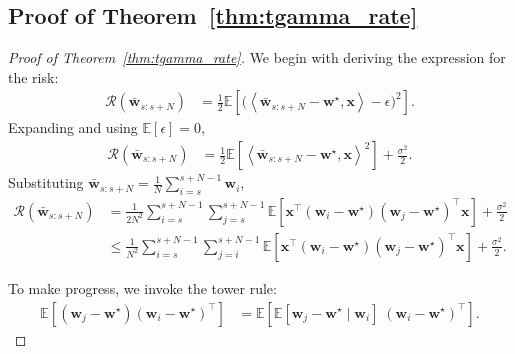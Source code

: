 \documentclass{article}
\def\bw{\bar{\mathbf{w}}}
\def\la{\langle

}
\def\ra{\rangle}
\def\x{{\mathbf{x}}}
\def\w{{\mathbf{w}}}
\def\risk{\mathcal{R}}
\def\ra{{\textnormal{a}}}
\newcommand{\E}{\mathbb{E}}
\def\bw{\bar{\mathbf{w}}}
\def\la{\langle}
\def\ra{\rangle}
\def\x{{\mathbf{x}}}
\def\w{{\mathbf{w}}}
\def\risk{\mathcal{R}}
\theoremstyle{plain}
\def\bw{\bar{\mathbf{w}}}
\def\la{\left\langle}
\def\ra{\right\rangle}
\def\x{{\mathbf{x}}}
\def\w{{\mathbf{w}}}
\def\risk{\mathcal{R}}
\def\E{\mathbb{E}}
\begin{document}
\subsection{Proof of Theorem~\ref{thm:tgamma_rate}}
\label{sec:proof_thm1}
\begin{proof}[Proof of Theorem~\ref{thm:tgamma_rate}]
We begin with deriving the expression for the risk:
\begin{align*}
    \risk(\bw_{s:s+N})
    &= \frac{1}{2}\E\left[\big(\la \bw_{s:s+N} - \w^\star, \x \ra - \epsilon\big)^2\right].
\end{align*}
Expanding and using $\E[\epsilon]=0$,
\begin{align*}
    \risk(\bw_{s:s+N})
    &= \frac{1}{2}\E\left[\la \bw_{s:s+N} - \w^\star, \x \ra^2\right]
    + \frac{\sigma^2}{2}.
\end{align*}
Substituting $\bw_{s:s+N} = \frac{1}{N}\sum_{i=s}^{s+N-1}\w_i$,
\begin{align*}
    \risk(\bw_{s:s+N})
    &= \frac{1}{2N^2}\sum_{i=s}^{s+N-1}\sum_{j=s}^{s+N-1}
    \E\left[
        \x^\top(\w_i-\w^\star)(\w_j-\w^\star)^\top \x
    \right]
    + \frac{\sigma^2}{2} \\
    &\le \frac{1}{N^2}\sum_{i=s}^{s+N-1}\sum_{j=i}^{s+N-1}
    \E\left[
        \x^\top(\w_i-\w^\star)(\w_j-\w^\star)^\top \x
    \right]
    + \frac{\sigma^2}{2}.
\end{align*}

To make progress, we invoke the tower rule:
\begin{align*}
    \E\left[(\w_j-\w^\star)(\w_i-\w^\star)^\top\right]
    &= \E\left[\E[\w_j-\w^\star \mid \w_i]\;(\w_i-\w^\star)^\top\right].
\end{align*}


\end{proof}
\end{document}
